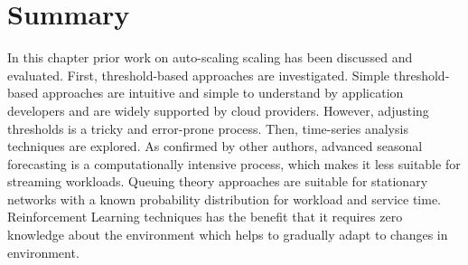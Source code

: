 \section{Summary}
\label{related:sum}

In this chapter prior work on auto-scaling scaling has been discussed and evaluated. First, threshold-based approaches are investigated. Simple threshold-based approaches are intuitive and simple to understand by application developers and are widely supported by cloud providers. However, adjusting thresholds is a tricky and error-prone process. Then, time-series analysis techniques are explored. As confirmed by other authors, advanced seasonal forecasting is a computationally intensive process, which makes it less suitable for streaming workloads. Queuing theory approaches are suitable for stationary networks with a known probability distribution for workload and service time. Reinforcement Learning techniques has the benefit that it requires zero knowledge about the environment which helps to gradually adapt to changes in environment.